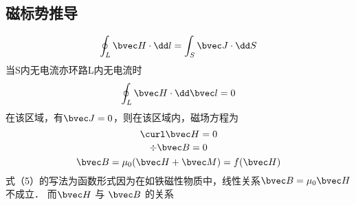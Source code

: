 
\subsection{磁标势推导}
\begin{equation}
\oint_L \bvec H \cdot \dd  l = \int_S \bvec J \cdot \dd S

\end{equation}当S内无电流亦环路L内无电流时
\begin{equation}
\oint_ L\bvec H \cdot \dd \bvec l = 0
\end{equation}
在该区域，有$\bvec J=0$，则在该区域内，磁场方程为 
\begin{equation}
\curl \bvec H =0
\end{equation}
\begin{equation}
\div \bvec B=0
\end{equation}
\begin{equation}
\bvec B=\mu_0(\bvec H+\bvec M)=f(\bvec H)
\end{equation}
式（5）的写法为函数形式因为在如铁磁性物质中，线性关系$\bvec B=\mu_0 \bvec H$不成立．
而$\bvec H$ 与 $\bvec B$ 的关系

